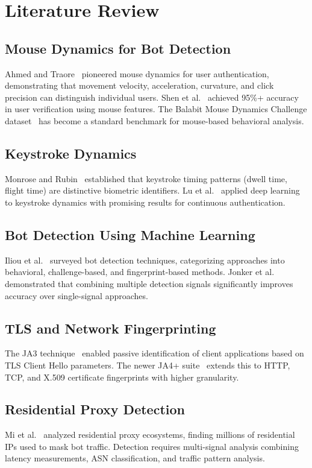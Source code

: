 \documentclass[12pt, a4paper]{article}
\begin{document}
\section{Literature Review}

\subsection{Mouse Dynamics for Bot Detection}
Ahmed and Traore~\cite{ahmed2007} pioneered mouse dynamics for user authentication, demonstrating that movement velocity, acceleration, curvature, and click precision can distinguish individual users. Shen et al.~\cite{shen2013} achieved 95\%+ accuracy in user verification using mouse features. The Balabit Mouse Dynamics Challenge dataset~\cite{balabit2016} has become a standard benchmark for mouse-based behavioral analysis.

\subsection{Keystroke Dynamics}
Monrose and Rubin~\cite{monrose2000} established that keystroke timing patterns (dwell time, flight time) are distinctive biometric identifiers. Lu et al.~\cite{lu2020} applied deep learning to keystroke dynamics with promising results for continuous authentication.

\subsection{Bot Detection Using Machine Learning}
Iliou et al.~\cite{iliou2021} surveyed bot detection techniques, categorizing approaches into behavioral, challenge-based, and fingerprint-based methods. Jonker et al.~\cite{jonker2019} demonstrated that combining multiple detection signals significantly improves accuracy over single-signal approaches.

\subsection{TLS and Network Fingerprinting}
The JA3 technique~\cite{ja3_2017} enabled passive identification of client applications based on TLS Client Hello parameters. The newer JA4+ suite~\cite{ja4_2024} extends this to HTTP, TCP, and X.509 certificate fingerprints with higher granularity.

\subsection{Residential Proxy Detection}
Mi et al.~\cite{mi2019} analyzed residential proxy ecosystems, finding millions of residential IPs used to mask bot traffic. Detection requires multi-signal analysis combining latency measurements, ASN classification, and traffic pattern analysis.
\end{document}
